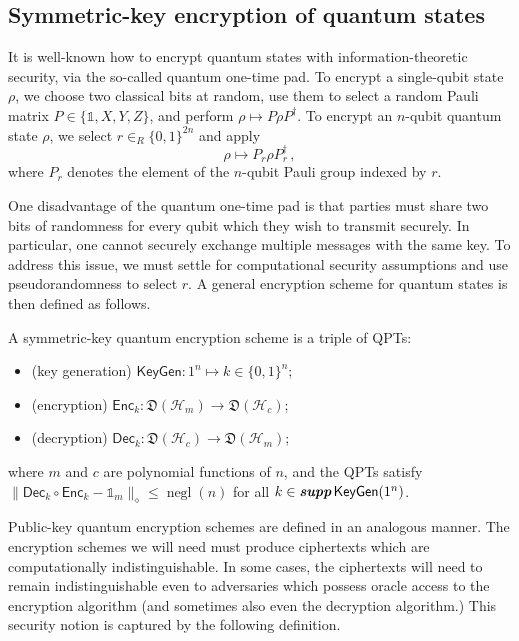 \documentclass[envcountsame]{llncs}
\numberwithin{equation}{section}
\newcommand{\one}{\mathds 1}
\newcommand{\opn}{\operatorname}
\newcommand{\negl}{\opn{negl}}
\newcommand{\KeyGen}{\ensuremath{\mathsf{KeyGen}}\xspace}
\newcommand{\Enc}{\ensuremath{\mathsf{Enc}}\xspace}
\newcommand{\Dec}{\ensuremath{\mathsf{Dec}}\xspace}
\newcommand{\inrand}{\in_R}
\newcommand{\states}{\mathfrak D}
\newcommand\supp{\textbf{supp}}
\begin{document}
\subsection{Symmetric-key encryption of quantum states}\label{sec:scheme}

It is well-known how to encrypt quantum states with information-theoretic security, via the so-called quantum one-time pad. To encrypt a single-qubit state $\rho$, we choose two classical bits at random, use them to select a random Pauli matrix $P \in \{\one, X, Y, Z\}$, and perform $\rho \mapsto P \rho P^\dagger$. To encrypt an $n$-qubit quantum state $\rho$, we select $r \inrand \{0,1\}^{2n}$ and apply
\begin{equation}\label{eq:quantum-one-time-pad}
\rho \longmapsto P_r \rho P_r^\dagger\,,
\end{equation}
where $P_r$ denotes the element of the $n$-qubit Pauli group indexed by $r$. 

One disadvantage of the quantum one-time pad is that parties must share two bits of randomness for every qubit which they wish to transmit securely. In particular, one cannot securely exchange multiple messages with the same key. To address this issue, we must settle for computational security assumptions and use pseudorandomness to select $r$. A general encryption scheme for quantum states is then defined as follows.

\begin{definition}\label{def:encryption-scheme}
A symmetric-key quantum encryption scheme is a triple of QPTs:
\begin{itemize}
\item (key generation) $\KeyGen : 1^n \longmapsto k \in \{0, 1\}^n$;
\item (encryption) $\Enc_k : \states (\mathcal H_m) \longrightarrow \states (\mathcal H_c)$;
\item (decryption) $\Dec_k : \states (\mathcal H_c) \longrightarrow \states (\mathcal H_m)$;
\end{itemize}
where $m$ and $c$ are polynomial functions of $n$, and the QPTs satisfy $\| \Dec_k \circ \Enc_k - \one_m \|_\diamond \leq \negl(n)$ for all $k \in \emph{\supp}\,\KeyGen(1^n)$.
\end{definition}

Public-key quantum encryption schemes are defined in an analogous manner. The encryption schemes we will need must produce ciphertexts which are computationally indistinguishable. In some cases, the ciphertexts will need to remain indistinguishable even to adversaries which possess oracle access to the encryption algorithm (and sometimes also even the decryption algorithm.) This security notion is captured by the following definition.
\end{document}
